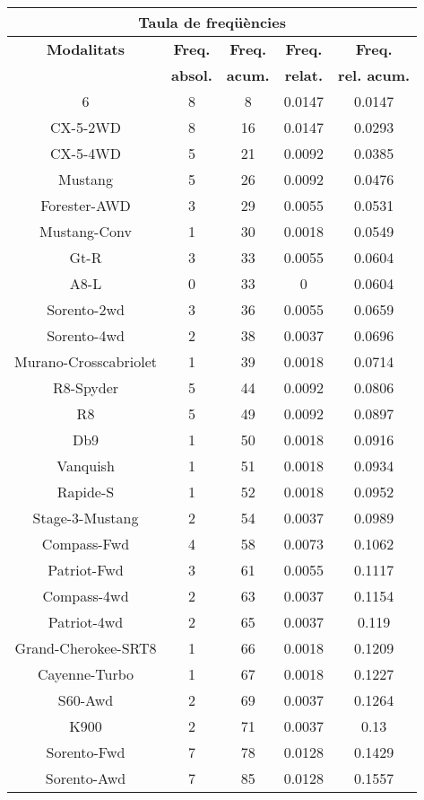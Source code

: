\begin{center}
\begin{tabular}{|c|c|c|c|@{}c@{}|}
\hline
\multicolumn{5}{|c|}{\bf Taula de freq\" u\`encies} \\ 
\hline
{\bf Modalitats} & {\bf Freq.} & {\bf Freq.} & {\bf Freq.} & {\bf Freq.} \\ 
 & {\bf absol.} & {\bf acum.} & {\bf relat.} & {\bf rel. acum.} \\ 
\hline
\hline
6 & 8 & 8 & 0.0147 & 0.0147 \\ 
CX-5-2WD & 8 & 16 & 0.0147 & 0.0293 \\ 
CX-5-4WD & 5 & 21 & 0.0092 & 0.0385 \\ 
Mustang & 5 & 26 & 0.0092 & 0.0476 \\ 
Forester-AWD & 3 & 29 & 0.0055 & 0.0531 \\ 
Mustang-Conv & 1 & 30 & 0.0018 & 0.0549 \\ 
Gt-R & 3 & 33 & 0.0055 & 0.0604 \\ 
A8-L & 0 & 33 & 0 & 0.0604 \\ 
Sorento-2wd & 3 & 36 & 0.0055 & 0.0659 \\ 
Sorento-4wd & 2 & 38 & 0.0037 & 0.0696 \\ 
Murano-Crosscabriolet & 1 & 39 & 0.0018 & 0.0714 \\ 
R8-Spyder & 5 & 44 & 0.0092 & 0.0806 \\ 
R8 & 5 & 49 & 0.0092 & 0.0897 \\ 
Db9 & 1 & 50 & 0.0018 & 0.0916 \\ 
Vanquish & 1 & 51 & 0.0018 & 0.0934 \\ 
Rapide-S & 1 & 52 & 0.0018 & 0.0952 \\ 
Stage-3-Mustang & 2 & 54 & 0.0037 & 0.0989 \\ 
Compass-Fwd & 4 & 58 & 0.0073 & 0.1062 \\ 
Patriot-Fwd & 3 & 61 & 0.0055 & 0.1117 \\ 
Compass-4wd & 2 & 63 & 0.0037 & 0.1154 \\ 
Patriot-4wd & 2 & 65 & 0.0037 & 0.119 \\ 
Grand-Cherokee-SRT8 & 1 & 66 & 0.0018 & 0.1209 \\ 
Cayenne-Turbo & 1 & 67 & 0.0018 & 0.1227 \\ 
S60-Awd & 2 & 69 & 0.0037 & 0.1264 \\ 
K900 & 2 & 71 & 0.0037 & 0.13 \\ 
Sorento-Fwd & 7 & 78 & 0.0128 & 0.1429 \\ 
Sorento-Awd & 7 & 85 & 0.0128 & 0.1557 \\ 

\end{tabular}
\end{center}
